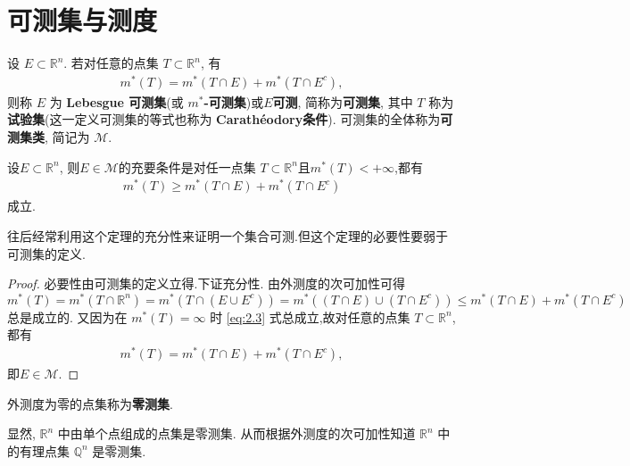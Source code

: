 \documentclass[../../main.tex]{subfiles}%
\begin{document}
\section{可测集与测度}

\begin{definition}[可测集]
设 \(E \subset \mathbb{R}^n\). 若对任意的点集 \(T \subset \mathbb{R}^n\), 有
\begin{align*}
m^*(T)=m^*(T \cap E)+m^*(T \cap E^c), 
\end{align*}
则称 \(E\) 为 \textbf{Lebesgue 可测集}(或 \textbf{\(m^*\)-可测集})或$E$\textbf{可测}, 简称为\textbf{可测集}, 其中 \(T\) 称为\textbf{试验集}(这一定义可测集的等式也称为 \textbf{Carathéodory条件}). 可测集的全体称为\textbf{可测集类}, 简记为 \(\mathscr{M}\). 
\end{definition}

\begin{theorem}[集合可测的充要条件]\label{theorem:可测的充要条件}
设\(E\subset \mathbb{R}^n\), 则$E\in \mathscr{M}$的充要条件是对任一点集 \(T \subset \mathbb{R}^n\)且\(m^*(T)< + \infty\),都有
\begin{align}
m^*(T) \geqslant  m^*(T \cap E)+m^*(T \cap E^c) \label{eq:2.3}
\end{align}
成立. 
\end{theorem}
\begin{remark}
往后经常利用这个定理的充分性来证明一个集合可测.但这个定理的必要性要弱于可测集的定义.
\end{remark}
\begin{proof}

必要性由可测集的定义立得.下证充分性.
由外测度的次可加性可得
\[
m^*(T)=m^*\left( T\cap \mathbb{R} ^n \right) =m^*\left( T\cap \left( E\cup E^c \right) \right) =m^*\left( \left( T\cap E \right) \cup \left( T\cap E^c \right) \right)  \leqslant  m^*(T \cap E)+m^*(T \cap E^c)
\]
总是成立的. 又因为在 \(m^*(T)=\infty\) 时 \eqref{eq:2.3} 式总成立,故对任意的点集 \(T \subset \mathbb{R}^n\),都有
\begin{align*}
m^*(T)=m^*(T \cap E)+m^*(T \cap E^c), 
\end{align*}
即$E\in \mathscr{M}$.

\end{proof}

\begin{definition}[零测集]
外测度为零的点集称为\textbf{零测集}. 
\end{definition}
\begin{remark}
显然, \(\mathbb{R}^n\) 中由单个点组成的点集是零测集. 从而根据外测度的次可加性知道 \(\mathbb{R}^n\) 中的有理点集 \(\mathbb{Q}^n\) 是零测集.
\end{remark}
\end{document}
